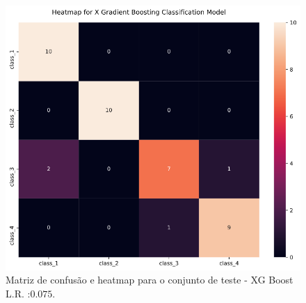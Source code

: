 \documentclass[
	article,			%
	11pt,				%
	oneside,			%
	a4paper,			%
	english,			%
	brazil,				%
	sumario=tradicional
	]{abntex2}
\begin{document}
\begin{figure}[h!]
 \centering
 \includegraphics[scale=0.5]{fig/xgb_cm.png}
 \caption{Matriz de confusão e heatmap para o conjunto de teste - XG Boost L.R. :$0.075$.}
 \label{fig:xgb_cm}
\end{figure}
\end{document}

